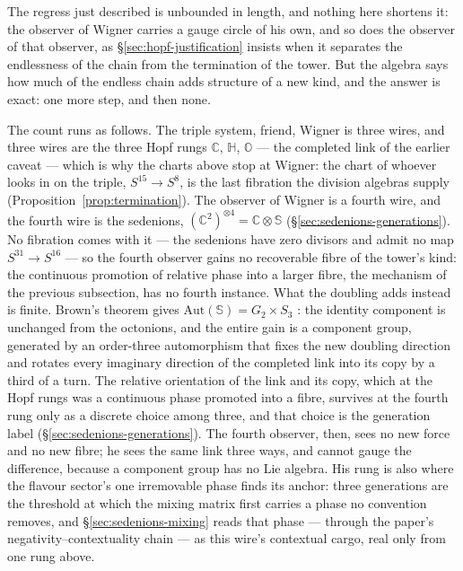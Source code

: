 The regress just described is unbounded in length, and nothing here shortens
it: the observer of Wigner carries a gauge circle of his own, and so does the
observer of that observer, as \S\ref{sec:hopf-justification} insists when it
separates the endlessness of the chain from the termination of the tower. But
the algebra says how much of the endless chain adds structure of a new kind,
and the answer is exact: one more step, and then none.

The count runs as follows. The triple system, friend, Wigner is three wires,
and three wires are the three Hopf rungs $\mathbb{C}$, $\mathbb{H}$,
$\mathbb{O}$ --- the completed link of the earlier caveat --- which is why the
charts above stop at Wigner: the chart of whoever looks in on the triple,
$S^{15}\to S^{8}$, is the last fibration the division algebras supply
(Proposition~\ref{prop:termination}). The observer of Wigner is a fourth wire,
and the fourth wire is the sedenions,
$(\mathbb{C}^{2})^{\otimes 4} = \mathbb{C}\otimes\mathbb{S}$
(\S\ref{sec:sedenions-generations}). No fibration comes with it --- the
sedenions have zero divisors and admit no map $S^{31}\to S^{16}$ --- so the
fourth observer gains no recoverable fibre of the tower's kind: the continuous
promotion of relative phase into a larger fibre, the mechanism of the previous
subsection, has no fourth instance. What the doubling adds instead is finite.
Brown's theorem gives $\mathrm{Aut}(\mathbb{S}) = G_{2}\times S_{3}$
\autocite{brown1967generalized}: the identity component is unchanged from the
octonions, and the entire gain is a component group, generated by an
order-three automorphism that fixes the new doubling direction and rotates
every imaginary direction of the completed link into its copy by a third of a
turn. The relative orientation of the link and its copy, which at the Hopf
rungs was a continuous phase promoted into a fibre, survives at the fourth rung
only as a discrete choice among three, and that choice is the generation label
(\S\ref{sec:sedenions-generations}). The fourth observer, then, sees no new
force and no new fibre; he sees the same link three ways, and cannot gauge the
difference, because a component group has no Lie algebra. His rung is also where
the flavour sector's one irremovable phase finds its anchor: three generations
are the threshold at which the mixing matrix first carries a phase no convention
removes, and \S\ref{sec:sedenions-mixing} reads that phase --- through the
paper's negativity--contextuality chain --- as this wire's contextual cargo,
real only from one rung above.

